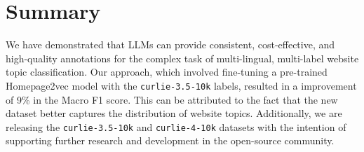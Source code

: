 \section{Summary}\label{sec:summary}

We have demonstrated that LLMs can provide consistent, cost-effective, and high-quality annotations for the complex task of multi-lingual, multi-label website topic classification.
Our approach, which involved fine-tuning a pre-trained Homepage2vec model with the \texttt{curlie-3.5-10k} labels, resulted in a improvement of 9\% in the Macro F1 score. 
This can be attributed to the fact that the new dataset better captures the distribution of website topics.
Additionally, we are releasing the \texttt{curlie-3.5-10k} and \texttt{curlie-4-10k} datasets with the intention of supporting further research and development in the open-source community.





